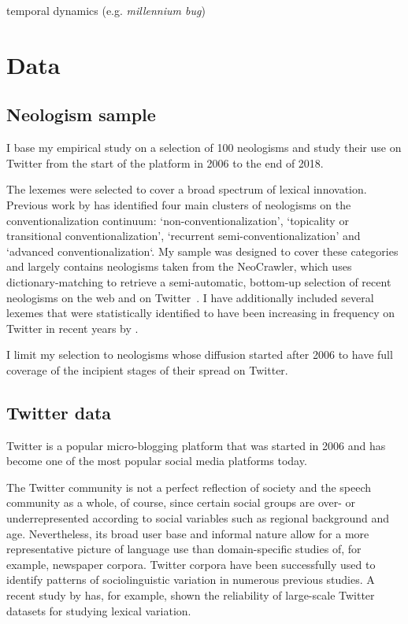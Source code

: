 \documentclass[
  a4paper,
  abstract=on,
  captions=tableabove
  ]{scrartcl}
\begin{document}
    temporal dynamics (e.g. \emph{millennium bug})


\section{Data}
  \label{sec:data}
  \subsection{Neologism sample}
    \label{subsec:neo-sample}

  I base my empirical study on a selection of 100 neologisms and study their use on Twitter from the start of the platform in 2006 to the end of 2018.

  The lexemes were selected to cover a broad spectrum of lexical innovation. Previous work by \textcite[115--147]{Kerremans2015WebNew} has identified four main clusters of neologisms on the conventionalization continuum: `non-conventionalization', `topicality or transitional conventionalization', `recurrent semi-conventionalization' and `advanced conventionalization`. My sample was designed to cover these categories and largely contains neologisms taken from the NeoCrawler, which uses dictionary-matching to retrieve a semi-automatic, bottom-up selection of recent neologisms on the web and on Twitter~\parencite{Kerremans2019UsingDatamining}. I have additionally included several lexemes that were statistically identified to have been increasing in frequency on Twitter in recent years by \textcite{Grieve2016AnalyzingLexical}.

  I limit my selection to neologisms whose diffusion started after 2006 to have full coverage of the incipient stages of their spread on Twitter.

  \subsection{Twitter data}
    \label{subsec:twitter-data}

    Twitter is a popular micro-blogging platform that was started in 2006 and has become one of the most popular social media platforms today.

    The Twitter community is not a perfect reflection of society and the speech community as a whole, of course, since certain social groups are over- or underrepresented according to social variables such as regional background and age. Nevertheless, its broad user base and informal nature allow for a more representative picture of language use than domain-specific studies of, for example, newspaper corpora. Twitter corpora have been successfully used to identify patterns of sociolinguistic variation in numerous previous studies. A recent study by \textcite{Grieve2019MappingLexical} has, for example, shown the reliability of large-scale Twitter datasets for studying lexical variation.
\end{document}
